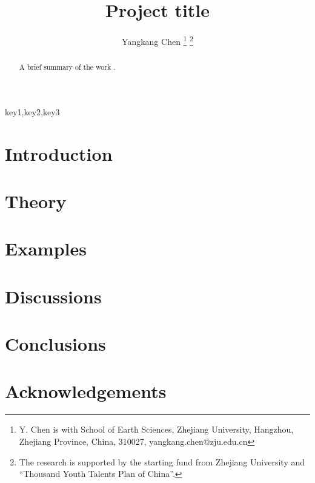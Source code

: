 \documentclass[10pt]{IEEEtran}
\begin{document}
\title{Project title}
\renewcommand{\thefootnote}{\fnsymbol{footnote}}
\author{Yangkang Chen
\thanks{Y. Chen is with School of Earth Sciences, Zhejiang University, Hangzhou, Zhejiang Province, China, 310027, yangkang.chen@zju.edu.cn}
\thanks{The research is supported by the starting fund from Zhejiang University and ``Thousand Youth Talents Plan of China''.}}
\maketitle

\begin{abstract}
A brief summary of the work \cite{yangkang20142}.
\end{abstract}

\begin{keywords}
key1,key2,key3
\end{keywords}

\section{Introduction}
\section{Theory}
\section{Examples}
\section{Discussions}
\section{Conclusions}
\section{Acknowledgements}





\end{document}
